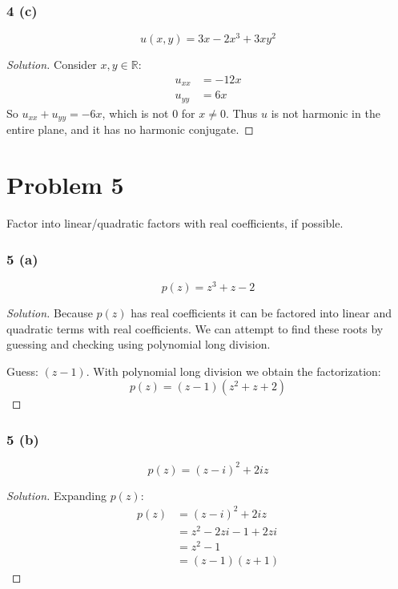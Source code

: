 \documentclass{article}
\newenvironment{solution}{
\begin{proof}[Solution]}{
\end{proof}}
\begin{document}
\subsubsection*{4 (c)}
\[
  u(x, y) = 3x - 2x^3 + 3xy^2
\]
\begin{solution}
  Consider $x, y \in \mathbb{R}$:
  \begin{align*}
    u_{xx} &= -12x
    \\ u_{yy} &= 6x
  \end{align*}
  So $u_{xx} + u_{yy} = -6x$, which is not $0$ for $x \neq 0$. Thus $u$ is not
  harmonic in the entire plane, and it has no harmonic conjugate.
\end{solution}

\section*{Problem 5}
Factor into linear/quadratic factors with real coefficients, if possible.

\subsubsection*{5 (a)}
\[
  p(z) = z^3 + z - 2
\]
\begin{solution}
  Because $p(z)$ has real coefficients it can be factored into linear and
  quadratic terms with real coefficients. We can attempt to find these roots by
  guessing and checking using polynomial long division.

  Guess: $(z - 1)$. With polynomial long division we obtain the factorization:
  \[
    p(z) = (z - 1)(z^2 + z + 2)
  \]
\end{solution}

\subsubsection*{5 (b)}
\[
  p(z) = (z - i)^2 + 2iz
\]
\begin{solution}
  Expanding $p(z)$:
  \begin{align*}
    p(z)
    &= (z - i)^2 + 2iz
    \\ &= z^2 - 2zi - 1 + 2zi
    \\ &= z^2 - 1
    \\ &= (z - 1)(z + 1)
  \end{align*}
\end{solution}

\end{document}
